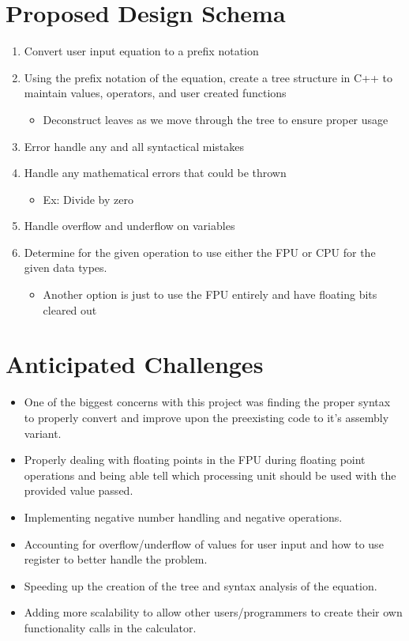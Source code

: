 \documentclass[a4paper,10pt]{article}
\begin{document}
\section*{Proposed Design Schema}
\begin{enumerate}
  \item Convert user input equation to a prefix notation 
  \item Using the prefix notation of the equation, create a tree structure in C++ to maintain values, operators, and user created functions
  \begin{itemize}
      \item Deconstruct leaves as we move through the tree to ensure proper usage
  \end{itemize}
  \item Error handle any and all syntactical mistakes
  \item Handle any mathematical errors that could be thrown
  \begin{itemize}
      \item Ex: Divide by zero
  \end{itemize}
  \item Handle overflow and underflow on variables
  \item Determine for the given operation to use either the FPU or CPU for the given data types. 
  \begin{itemize}
      \item Another option is just to use the FPU entirely and have floating bits cleared out 
  \end{itemize}
\end{enumerate}




\section*{Anticipated Challenges}

\begin{itemize}
  \item One of the biggest concerns with this project was finding the proper syntax to properly convert and improve upon the preexisting code to it's assembly variant. 
  \item Properly dealing with floating points in the FPU during floating point operations and being able tell which processing unit should be used with the provided value passed.
  \item Implementing negative number handling and negative operations.
  \item Accounting for overflow/underflow of values for user input and how to use register to better handle the problem. 
  \item Speeding up the creation of the tree and syntax analysis of the equation.
  \item Adding more scalability to allow other users/programmers to create their own functionality calls in the calculator.
\end{itemize}
\end{document}
